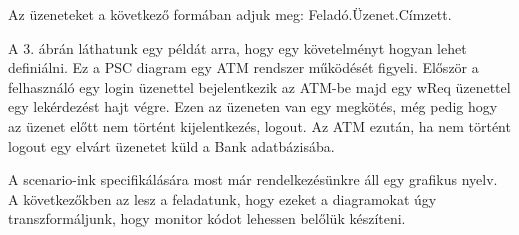 Az üzeneteket a következő formában adjuk meg: Feladó.Üzenet.Címzett.

A 3. ábrán láthatunk egy példát arra, hogy egy követelményt hogyan lehet definiálni. Ez a PSC diagram egy ATM rendszer működését figyeli. Először a felhasználó egy login üzenettel bejelentkezik az ATM-be majd egy wReq üzenettel egy lekérdezést hajt végre. Ezen az üzeneten van egy megkötés, még pedig hogy az üzenet előtt nem történt kijelentkezés, logout. Az ATM ezután, ha nem történt logout egy elvárt üzenetet küld a Bank adatbázisába.

A scenario-ink specifikálására most már rendelkezésünkre áll egy grafikus nyelv. A következőkben az lesz a feladatunk, hogy ezeket a diagramokat úgy transzformáljunk, hogy monitor kódot lehessen belőlük készíteni.
